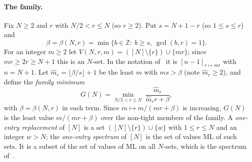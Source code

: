 \documentclass[11pt]{article}
\theoremstyle{definition}
\theoremstyle{remark}
\newcommand{\ML}{\mathrm{ML}}
\newcommand{\ZZ}{\mathbb{Z}}
\begin{document}
\paragraph{The family.}
Fix $N\ge2$ and $r$ with $N/2<r\le N$ (so $r\ge2$). Put $s=N+1-r$ (so $1\le s\le r$) and
\[
\beta=\beta(N,r)=\min\{b\in\ZZ:\ b\ge s,\ \gcd(b,r)=1\}.
\]
For an integer $m\ge2$ let $V(N,r,m)=([N]\setminus\{r\})\cup\{mr\}$; since $mr\ge2r\ge N+1$ this is an $N$-set. In the notation of~\cite{GW,Z} it is $[n-1]_{r\mapsto mr}$ with $n=N+1$. Let $\hat m_r=\lfloor\beta/s\rfloor+1$ be the least $m$ with $ms>\beta$ (note $\hat m_r\ge2$), and define the \emph{family minimum}
\[
G(N)=\min_{N/2<r\le N}\ \frac{\hat m_r}{\hat m_rr+\beta},
\]
with $\beta=\beta(N,r)$ in each term. Since $m\mapsto m/(mr+\beta)$ is increasing, $G(N)$ is the least value $m/(mr+\beta)$ over the non-tight members of the family. A \emph{one-entry replacement} of $[N]$ is a set $([N]\setminus\{r\})\cup\{w\}$ with $1\le r\le N$ and an integer $w>N$; the \emph{one-entry spectrum} of $[N]$ is the set of values $\ML$ of such sets. It is a subset of the set of values of $\ML$ on all $N$-sets, which is the spectrum of~\cite{K,FS,JK}.
\end{document}
